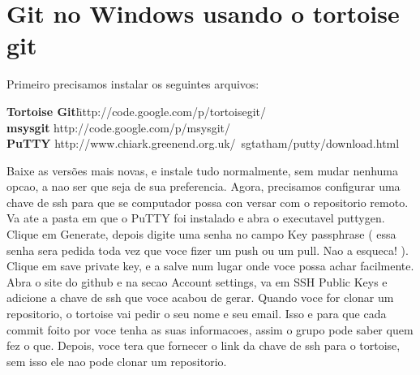 \documentclass{article}
\begin{document}
\section{Git no Windows usando o tortoise git}
    Primeiro precisamos instalar os seguintes arquivos:
    \begin{tabbing}
        \hspace{1cm}\=\textbf{Tortoise Git}\quad    \=http://code.google.com/p/tortoisegit/\\
                    \>\textbf{msysgit}              \>http://code.google.com/p/msysgit/\\
                    \>\textbf{PuTTY}                \>http://www.chiark.greenend.org.uk/~sgtatham/putty/download.html
    \end{tabbing}
Baixe as versões mais novas, e instale tudo normalmente, sem mudar nenhuma opcao,
a nao ser que seja de sua preferencia.
Agora, precisamos configurar uma chave de ssh para que se computador possa con
versar com o repositorio remoto. Va ate a pasta em que o PuTTY foi instalado e 
abra o executavel puttygen. Clique em Generate, depois digite uma senha no campo
Key passphrase ( essa senha sera pedida toda vez que voce fizer um push ou um 
pull. Nao a esqueca! ). Clique em save private key, e a salve num lugar onde 
voce possa achar facilmente. Abra o site do github e na secao Account settings,
va em SSH Public Keys e adicione a chave de ssh que voce acabou de gerar.
Quando voce for clonar um repositorio, o tortoise vai pedir o seu nome e seu email.
Isso e para que cada commit foito por voce tenha as suas informacoes, assim
o grupo pode saber quem fez o que. Depois, voce tera que fornecer o link da chave 
de ssh para o tortoise, sem isso ele nao pode clonar um repositorio.
\end{document}
